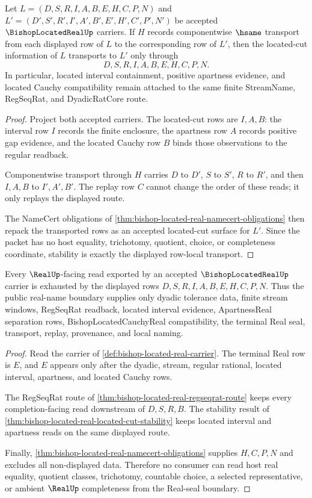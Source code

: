 \begin{theorem}
\label{thm:bishop-located-real-located-cut-stability}
Let $L=(D,S,R,I,A,B,E,H,C,P,N)$ and $L'=(D',S',R',I',A',B',E',H',C',P',N')$ be accepted $\BishopLocatedRealUp$ carriers. If $H$ records componentwise $\hsame$ transport from each displayed row of $L$ to the corresponding row of $L'$, then the located-cut information of $L$ transports to $L'$ only through
$$
D,S,R,I,A,B,E,H,C,P,N .
$$
In particular, located interval containment, positive apartness evidence, and located Cauchy compatibility remain attached to the same finite StreamName, RegSeqRat, and DyadicRatCore route.
\end{theorem}
\begin{proof}
Project both accepted carriers. The located-cut rows are $I,A,B$: the interval row $I$ records the finite enclosure, the apartness row $A$ records positive gap evidence, and the located Cauchy row $B$ binds those observations to the regular readback.

Componentwise transport through $H$ carries $D$ to $D'$, $S$ to $S'$, $R$ to $R'$, and then $I,A,B$ to $I',A',B'$. The replay row $C$ cannot change the order of these reads; it only replays the displayed route.

The NameCert obligations of \autoref{thm:bishop-located-real-namecert-obligations} then repack the transported rows as an accepted located-cut surface for $L'$. Since the packet has no host equality, trichotomy, quotient, choice, or completeness coordinate, stability is exactly the displayed row-local transport.
\end{proof}

\begin{theorem}
\label{thm:bishop-located-real-real-seal-boundary}
Every $\RealUp$-facing read exported by an accepted $\BishopLocatedRealUp$ carrier is exhausted by the displayed rows $D,S,R,I,A,B,E,H,C,P,N$. Thus the public real-name boundary supplies only dyadic tolerance data, finite stream windows, RegSeqRat readback, located interval evidence, ApartnessReal separation rows, BishopLocatedCauchyReal compatibility, the terminal Real seal, transport, replay, provenance, and local naming.
\end{theorem}
\begin{proof}
Read the carrier of \autoref{def:bishop-located-real-carrier}. The terminal Real row is $E$, and $E$ appears only after the dyadic, stream, regular rational, located interval, apartness, and located Cauchy rows.

The RegSeqRat route of \autoref{thm:bishop-located-real-regseqrat-route} keeps every completion-facing read downstream of $D,S,R,B$. The stability result of \autoref{thm:bishop-located-real-located-cut-stability} keeps located interval and apartness reads on the same displayed route.

Finally, \autoref{thm:bishop-located-real-namecert-obligations} supplies $H,C,P,N$ and excludes all non-displayed data. Therefore no consumer can read host real equality, quotient classes, trichotomy, countable choice, a selected representative, or ambient $\RealUp$ completeness from the Real-seal boundary.
\end{proof}

